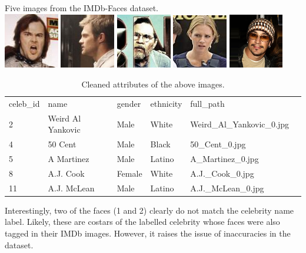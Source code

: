\begin{center}
Five images from the IMDb-Faces dataset.\\
{\includegraphics[width=0.18\textwidth]{figure/imdb_1.jpg}}
{\includegraphics[width=0.18\textwidth]{figure/imdb_2.jpg}}
{\includegraphics[width=0.18\textwidth]{figure/imdb_3.jpg}}
{\includegraphics[width=0.18\textwidth]{figure/imdb_4.jpg}}
{\includegraphics[width=0.18\textwidth]{figure/imdb_5.jpg}}
\end{center}
\begin{table}[H]
\small
\centering
\caption{Cleaned attributes of the above images.}
\begin{tabular}{llllll}
celeb\_id & name &  gender & ethnicity & full\_path \\
2 & Weird Al Yankovic & Male & White & Weird\_Al\_Yankovic\_0.jpg \\
4 & 50 Cent & Male & Black & 50\_Cent\_0.jpg \\
5 & A Martinez & Male & Latino & A\_Martinez\_0.jpg  \\
8 & A.J. Cook & Female & White & A.J.\_Cook\_0.jpg \\
11 & A.J. McLean & Male & Latino & A.J.\_McLean\_0.jpg \\
\end{tabular}
\end{table}
\noindent Interestingly, two of the faces (1 and 2) clearly do not match the celebrity name label. Likely, these are costars of the labelled celebrity whose faces were also tagged in their IMDb images. However, it raises the issue of inaccuracies in the dataset.